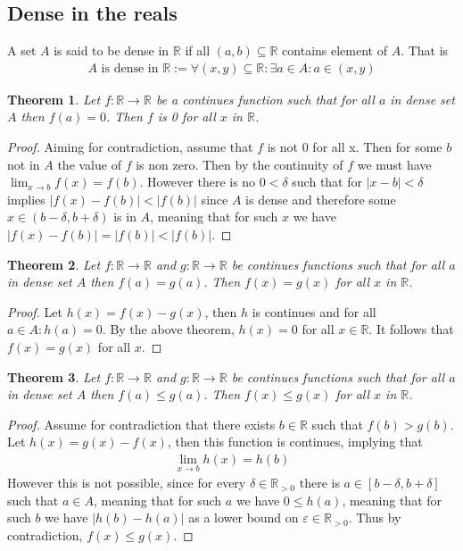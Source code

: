 \documentclass{article}
\theoremstyle{plain}
\newtheorem{theorem}{Theorem}
\theoremstyle{definition}
\begin{document}
\subsection{Dense in the reals}
A set $A$ is said to be dense in $\mathbb{R}$ if all $(a,b) \subseteq
\mathbb{R}$ contains element of $A$. That is 
\begin{align*}
	A \text{ is dense in } \mathbb{R} := \forall (x,y) \subseteq \mathbb{R}:
	\exists a \in A: a \in (x,y)
\end{align*}
\begin{theorem}
	Let $f: \mathbb{R} \rightarrow \mathbb{R}$ be a continues function such that
	for all $a$ in dense set $A$ then $f(a)=0$. Then $f$ is 0 for all $x$ in
	$\mathbb{R}$.
\end{theorem}
\begin{proof}
	Aiming for contradiction, assume that $f$ is not 0 for all x. Then for some
	$b$ not in $A$ the value of $f$ is non zero. Then by the continuity of $f$ 
	we must have $\lim_{x \rightarrow b} f(x) = f(b)$. However there is no $0 <
	\delta$ such that for $|x-b| < \delta$ implies $|f(x)-f(b)|<|f(b)|$ since
	$A$ is dense and therefore some $x \in (b-\delta,b+\delta)$ is in $A$,
	meaning that for such $x$ we have $|f(x)-f(b)| = |f(b)| < |f(b)|$.
\end{proof}
\begin{theorem}
	Let $f: \mathbb{R} \rightarrow \mathbb{R}$ and $g: \mathbb{R} \rightarrow 
	\mathbb{R}$ be continues functions such that
	for all $a$ in dense set $A$ then $f(a)=g(a)$. Then $f(x)=g(x)$ for all $x$ 
	in $\mathbb{R}$.
\end{theorem}
\begin{proof}
	Let $h(x) = f(x)-g(x)$, then $h$ is continues and for all $a \in A: h(a) 
	= 0$. By the above theorem, $h(x)=0$ for all $x \in \mathbb{R}$. It follows
	that $f(x)=g(x)$ for all $x$.
\end{proof}
\begin{theorem}
	Let $f: \mathbb{R} \rightarrow \mathbb{R}$ and $g: \mathbb{R} \rightarrow 
	\mathbb{R}$ be continues functions such that
	for all $a$ in dense set $A$ then $f(a) \leq g(a)$. Then $f(x) \leq g(x)$ 
	for all $x$ in $\mathbb{R}$.
\end{theorem}
\begin{proof}
	Assume for contradiction that there exists $b \in \mathbb{R}$ such that
	$f(b)>g(b)$. Let $h(x)=g(x)-f(x)$, then this function is continues, implying
	that
	\begin{align}
		\lim_{x \rightarrow b} h(x) = h(b)
	\end{align}
	However this is not possible, since for every $\delta \in
	\mathbb{R}_{>0}$ there is $a \in [b-\delta,b+\delta]$ such that $a \in A$,
	meaning that for such $a$ we have $0 \leq h(a)$, meaning that for such $b$
	we have $|h(b)-h(a)|$ as a lower bound on $\varepsilon \in \mathbb{R}_{>0}$.
	Thus by contradiction, $f(x) \leq g(x)$.
\end{proof}
\end{document}
